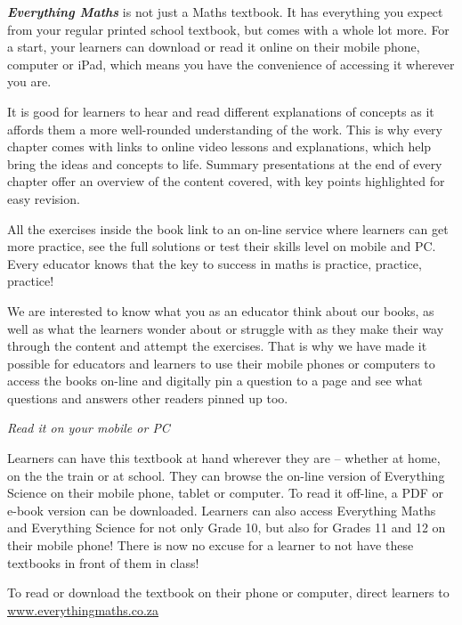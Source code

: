 \par
{\Large
\textbf{\textit{Everything Maths}} is not just a Maths textbook. It has everything you expect from
your regular printed school textbook, but comes with a whole lot more. For a start, your learners can download or read it
online on their mobile phone, computer or iPad, which means you have the convenience of accessing
it wherever you are.\par


It is good for learners to hear and read different explanations of concepts as it affords them a more well-rounded understanding of the work. This is why every chapter comes with links to online video
lessons and explanations, which help bring the ideas and concepts to life. Summary presentations at
the end of every chapter offer an overview of the content covered, with key points highlighted for easy
revision.\par

All the exercises inside the book link to an on-line service where
learners can get more practice, see the full
solutions or test their skills level on mobile and PC. Every educator knows that the key to success in maths is practice, practice, practice!
\par


We are interested to know what you as an educator think about our books, as well as what the learners
wonder about or struggle with as they make their way through the content and attempt the exercises. That is
why we have made it possible for educators and learners to use their mobile phones or computers to access
the books on-line and digitally pin a question to a page and see what questions and answers other readers
pinned up too.
\par


}




\newpage
\thispagestyle{empty}

{\normalfont\sffamily\fontsize{22}\normalfont\itshape Read it on your mobile or PC} \par

{\Large
Learners can have this textbook at hand wherever they are – whether at home, on the the train or at school.
They can browse the on-line version of Everything Science on their mobile phone, tablet or computer. To
read it off-line, a PDF or e-book version can be downloaded. Learners can also access Everything Maths
and Everything Science for not only Grade 10, but also for Grades 11 and 12 on their mobile phone! There is
now no excuse for a learner to not have these textbooks in front of them in class!
\par


To read or download the textbook on their phone or computer, direct learners to \\ \underline{www.everythingmaths.co.za}} \vspace*{2cm}


